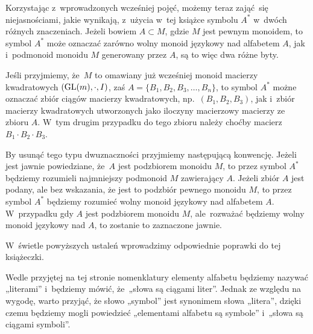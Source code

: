 \documentclass[a4paper,11pt]{article}
\begin{document}
\start {} Korzystając z~wprowadzonych wcześniej pojęć, możemy teraz
zająć~się niejasnościami, jakie wynikają, z~użycia w~tej książce symbolu
$A^{ * }$ w~dwóch różnych znaczeniach. Jeżeli bowiem $A \subset M$, gdzie $M$ jest
pewnym monoidem, to symbol $A^{ * }$ może oznaczać zarówno wolny monoid
językowy nad alfabetem $A$, jak i~podmonoid monoidu $M$ generowany przez
$A$, są to więc dwa różne byty.

Jeśli przyjmiemy, że~$M$ to omawiany już wcześniej monoid macierzy
kwadratowych $( \mathrm{GL}( m ), \cdot, I )$, zaś
$A = \{ B_{ 1 }, B_{ 2 }, B_{ 3 }, \ldots, B_{ n } \}$, to symbol $A^{ * }$ możne
oznaczać zbiór ciągów macierzy kwadratowych,
np.~$( B_{ 1 }, B_{ 2 }, B_{ 3 } )$, jak i~zbiór macierzy kwadratowych
utworzonych jako iloczyny macierzowy macierzy ze zbioru $A$. W~tym drugim
przypadku do tego zbioru należy choćby macierz $B_{ 1 } \cdot B_{ 2 } \cdot B_{ 3 }$.

By usunąć tego typu dwuznaczności przyjmiemy następującą konwencję. Jeżeli
jest jawnie powiedziane, że~$A$ jest podzbiorem monoidu $M$, to przez symbol
$A^{ * }$ będziemy rozumieli najmniejszy podmonoid $M$ zawierający $A$.
Jeżeli zbiór $A$ jest podany, ale bez wskazania, że jest to podzbiór pewnego
monoidu $M$, to przez symbol $A^{ * }$ będziemy rozumieć wolny monoid
językowy nad alfabetem $A$. W~przypadku gdy $A$ jest podzbiorem monoidu $M$,
ale~rozważać będziemy wolny monoid językowy nad $A$, to zostanie to
zaznaczone jawnie.

W~świetle powyższych ustaleń wprowadzimy odpowiednie poprawki do tej
książeczki.

\vspace{\spaceFour}



\start {} Wedle przyjętej na tej stronie nomenklatury elementy
alfabetu będziemy nazywać „literami” i~będziemy mówić, że~„słowa są
ciągami liter”. Jednak ze względu na wygodę, warto przyjąć, że słowo
„symbol” jest synonimem słowa „litera”, dzięki czemu będziemy mogli
powiedzieć „elementami alfabetu są symbole” i~„słowa są ciągami
symboli”.

\vspace{\spaceFour}









\end{document}
